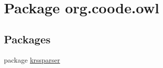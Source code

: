 \hypertarget{namespaceorg_1_1coode_1_1owl}{\section{Package org.\-coode.\-owl}
\label{namespaceorg_1_1coode_1_1owl}
}
\subsection*{Packages}
\begin{DoxyCompactItemize}
\item 
package \hyperlink{namespaceorg_1_1coode_1_1owl_1_1krssparser}{krssparser}
\end{DoxyCompactItemize}
